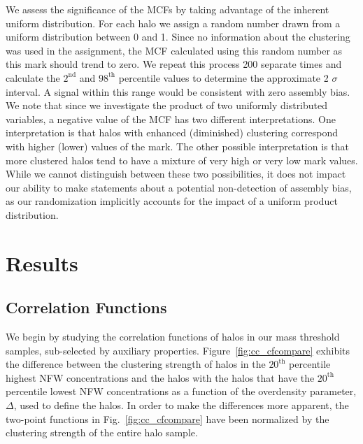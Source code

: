\documentclass[usenatbib,fleqn]{mnras}
\begin{document}
We assess the significance of the MCFs by taking advantage of the inherent uniform distribution. For each halo we assign a random number drawn from a uniform distribution between 0 and 1. Since no information about the clustering was used in the assignment, the MCF calculated using this random number as this mark should trend to zero. We repeat this process 200 separate times and calculate the $2^{\mathrm{nd}}$ and $98^{\mathrm{th}}$ percentile values to determine the approximate 2 $\sigma$ interval. A signal within this range would be consistent with zero assembly bias. We note that since we investigate the product of two uniformly distributed variables, a negative value of the MCF has two different interpretations. One interpretation is that halos with enhanced (diminished) clustering correspond with higher (lower) values of the mark. The other possible interpretation is that more clustered halos tend to have a mixture of very high or very low mark values. While we cannot distinguish between these two possibilities, it does not impact our ability to make statements about a potential non-detection of assembly bias, as our randomization implicitly accounts for the impact of a uniform product distribution.


\section[]{Results}
\label{section:results}


\subsection{Correlation Functions}
\label{sub:cfresults}


We begin by studying the correlation functions of halos in our mass threshold samples, sub-selected by auxiliary
properties. Figure~\ref{fig:cc_cfcompare} exhibits the difference between the clustering strength of halos in the
$20^{\mathrm{th}}$ percentile highest NFW concentrations and the halos with the halos that have the
$20^{\mathrm{th}}$ percentile lowest NFW concentrations as a function of the overdensity parameter, $\Delta$, used to
define the halos. In order to make the differences more apparent, the two-point functions in 
Fig.~\ref{fig:cc_cfcompare} have been normalized by the clustering strength of the entire halo sample. 
\end{document}
